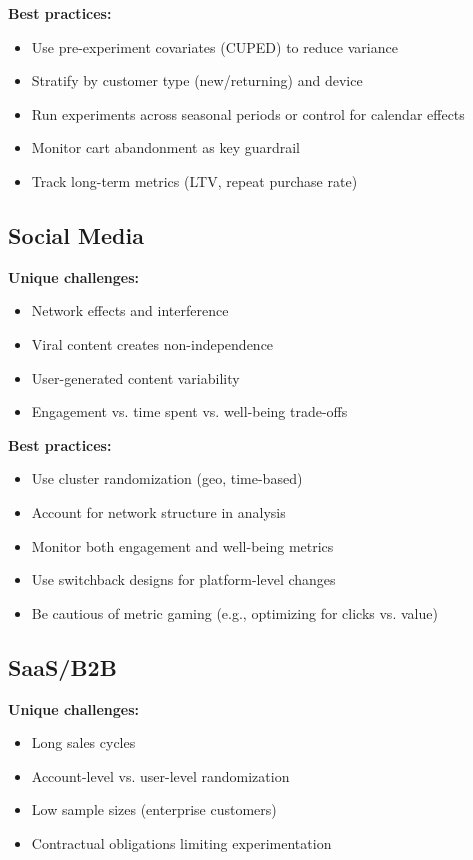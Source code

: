 \textbf{Best practices:}
\begin{itemize}
    \item Use pre-experiment covariates (CUPED) to reduce variance
    \item Stratify by customer type (new/returning) and device
    \item Run experiments across seasonal periods or control for calendar effects
    \item Monitor cart abandonment as key guardrail
    \item Track long-term metrics (LTV, repeat purchase rate)
\end{itemize}

\subsection{Social Media}

\textbf{Unique challenges:}
\begin{itemize}
    \item Network effects and interference
    \item Viral content creates non-independence
    \item User-generated content variability
    \item Engagement vs. time spent vs. well-being trade-offs
\end{itemize}

\textbf{Best practices:}
\begin{itemize}
    \item Use cluster randomization (geo, time-based)
    \item Account for network structure in analysis
    \item Monitor both engagement and well-being metrics
    \item Use switchback designs for platform-level changes
    \item Be cautious of metric gaming (e.g., optimizing for clicks vs. value)
\end{itemize}

\subsection{SaaS/B2B}

\textbf{Unique challenges:}
\begin{itemize}
    \item Long sales cycles
    \item Account-level vs. user-level randomization
    \item Low sample sizes (enterprise customers)
    \item Contractual obligations limiting experimentation
\end{itemize}

